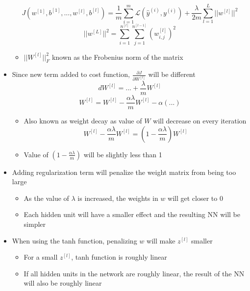 \documentclass[12pt, letterpaper]{article}
\begin{document}
\begin{itemize}
        $$J(w^{[1]},b^{[1]},...,w^{[l]}, b^{[l]})=\frac{1}{m}\sum_{i=1}^m\mathcal{L}(\hat{y}^{(i)}, y^{(i)})+\frac{\lambda}{2m}\sum_{l=1}^L||w^{[l]}||^2$$
        $$||w^{[L]}||^2=\sum^{n^{[l]}}_{i=1}\sum_{j=1}^{n^{[l-1]}} (w^{[l]}_{i,j})^2$$
        \begin{itemize}
            \item $||W^{[l]}||^2_F$ known as the Frobenius norm of the matrix
        \end{itemize}
        \item Since new term added to cost function, $\frac{\partial J}{\partial W^{[l]}}$ will be different
        $$dW^{[l]}=...+\frac{\lambda}{m}W^{[l]}$$
        $$W^{[l]}=W^{[l]}-\frac{\alpha\lambda}{m}W^{[l]}-\alpha(...)$$ 
        \begin{itemize}
            \item Also known as weight decay as value of $W$ will decrease on every iteration
            $$W^{[l]}-\frac{\alpha\lambda}{m}W^{[l]}=\left(1-\frac{\alpha\lambda}{m}\right)W^{[l]}$$
            \item Value of $\left(1-\frac{\alpha\lambda}{m}\right)$ will be slightly less than 1
        \end{itemize}
        \item Adding regularization term will penalize the weight matrix from being too large
        \begin{itemize}
            \item As the value of $\lambda$ is increased, the weights in $w$ will get closer to 0 
            \item Each hidden unit will have a smaller effect and the resulting NN will be simpler
        \end{itemize}
        \item When using the tanh function, penalizing $w$ will make $z^{[l]}$ smaller
        \begin{itemize}
            \item For a small $z^{[l]}$, tanh function is roughly linear
            \item If all hidden units in the network are roughly linear, the result of the NN will also be roughly linear
        \end{itemize}
    \end{itemize}
\end{document}

